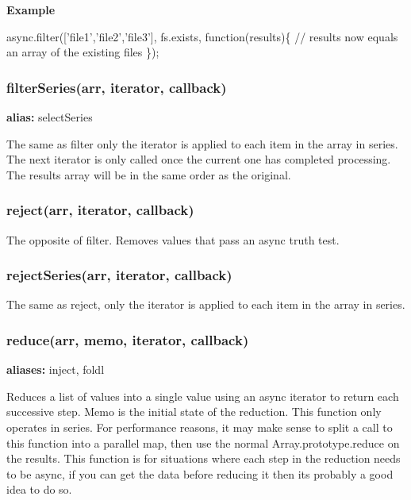 {\bfseries Example}


\begin{DoxyCode}
async.filter([\textcolor{stringliteral}{'file1'},\textcolor{stringliteral}{'file2'},\textcolor{stringliteral}{'file3'}], fs.exists, \textcolor{keyword}{function}(results)\{
    \textcolor{comment}{// results now equals an array of the existing files}
\});
\end{DoxyCode}
 



\label{_filterSeries}%
 \subsubsection*{filter\+Series(arr, iterator, callback)}

{\bfseries alias\+:} select\+Series

The same as filter only the iterator is applied to each item in the array in series. The next iterator is only called once the current one has completed processing. The results array will be in the same order as the original. 



\label{_reject}%
 \subsubsection*{reject(arr, iterator, callback)}

The opposite of filter. Removes values that pass an async truth test. 



\label{_rejectSeries}%
 \subsubsection*{reject\+Series(arr, iterator, callback)}

The same as reject, only the iterator is applied to each item in the array in series.





\label{_reduce}%
 \subsubsection*{reduce(arr, memo, iterator, callback)}

{\bfseries aliases\+:} inject, foldl

Reduces a list of values into a single value using an async iterator to return each successive step. Memo is the initial state of the reduction. This function only operates in series. For performance reasons, it may make sense to split a call to this function into a parallel map, then use the normal Array.\+prototype.\+reduce on the results. This function is for situations where each step in the reduction needs to be async, if you can get the data before reducing it then it\textquotesingle{}s probably a good idea to do so.

